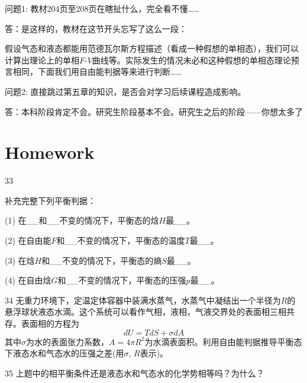 \documentclass[CJK]{beamer}
\begin{document}
\begin{frame}
  \bch
  问题1: 教材204页至208页在瞎扯什么，完全看不懂……

  \skiplines
  
  答：是这样的，教材在这节开头忘写了这么一段：

  {\small 假设气态和液态都能用范德瓦尔斯方程描述（看成一种假想的单相态），我们可以计算出理论上的单相$F$-$V$曲线等。实际发生的情况未必和这种假想的单相态理论预言相同，下面我们用自由能判据等来进行判断……}

  \ech
\end{frame}


\begin{frame}
  \bch
  问题2: 直接跳过第五章的知识，是否会对学习后续课程造成影响。

  \skiplines
  
  答：本科阶段肯定不会。研究生阶段基本不会。研究生之后的阶段——你想太多了\bye

  \ech
\end{frame}


\section{Homework}

\begin{frame}
  \bch
  {\small
  \bitem
\item[33]{补充完整下列平衡判据：
  \bitem
\item[(1)]{在\_\_和\_\_不变的情况下，平衡态的焓$H$最\_\_。}
\item[(2)]{在自由能$F$和\_\_不变的情况下，平衡态的温度$T$最\_\_。}
\item[(3)]{在焓$H$和\_\_不变的情况下，平衡态的熵$S$最\_\_。}
\item[(4)]{在自由焓$G$和\_\_不变的情况下，平衡态的压强$p$最\_\_。}
  \eitem}
\item[34]{无重力环境下，定温定体容器中装满水蒸气，水蒸气中凝结出一个半径为$R$的悬浮球状液态水滴。这个系统可以看作气相，液相，气液交界处的表面相三相共存。表面相的方程为
  $$ dU = TdS + \sigma dA $$
其中$\sigma$为水的表面张力系数，$A = 4\pi R^2$为水滴表面积。利用自由能判据推导平衡态下液态水和气态水的压强之差(用$\sigma$, $R$表示)。}
\item[35]{上题中的相平衡条件还是液态水和气态水的化学势相等吗？为什么？}
  \eitem
  }
  \ech
\end{frame}
\end{document}
